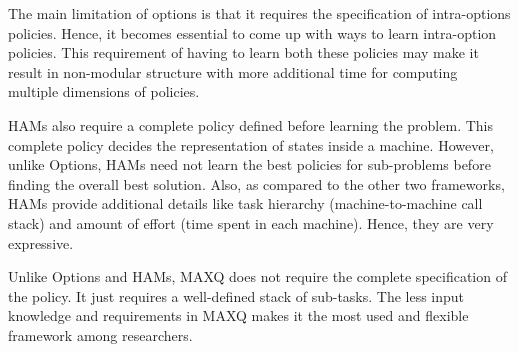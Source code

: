 The main limitation of options is that it requires the specification of intra-options policies.
Hence, it becomes essential to come up with ways to learn intra-option policies.  This requirement of having to learn both these policies may make it result in non-modular structure with more additional time for computing multiple dimensions of policies.

HAMs also require a complete policy defined before learning the problem. This complete policy decides the representation of states inside a machine. However, unlike Options, HAMs need not learn the best policies for sub-problems before finding the overall best solution. Also, as compared to the other two frameworks, HAMs provide additional details like task hierarchy (machine-to-machine call stack) and amount of effort (time spent in each machine). Hence, they are very expressive.

Unlike Options and HAMs, MAXQ does not require the complete specification of the policy. It just requires a well-defined stack of sub-tasks. The less input knowledge and requirements in MAXQ makes it the most used and flexible framework among researchers.
